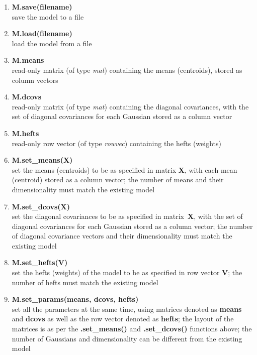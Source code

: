 \begin{enumerate}[{$\bullet$}]
\item
{\bf M.save(filename)}\\
save the model to a file

\item
{\bf M.load(filename)}\\
load the model from a file

\item
{\bf M.means}\\
read-only matrix (of type {\it mat}) containing the means (centroids), stored as column vectors

\item
{\bf M.dcovs}\\
read-only matrix (of type {\it mat}) containing the diagonal covariances, with the set of diagonal covariances for each Gaussian stored as a column vector

\item
{\bf M.hefts}\\
read-only row vector (of type {\it rowvec}) containing the hefts (weights)

\item
{\bf M.set\_means(X)}\\
set the means (centroids) to be as specified in matrix {\bf X}, with each mean (centroid) stored as a column vector;
the number of means and their dimensionality must match the existing model

\item
{\bf M.set\_dcovs(X)}\\
set the diagonal covariances to be as specified in matrix~{\bf X}, with the set of diagonal covariances for each Gaussian stored as a column vector;
the number of diagonal covariance vectors and their dimensionality must match the existing model

\item
{\bf M.set\_hefts(V)}\\
set the hefts (weights) of the model to be as specified in row vector {\bf V};
the number of hefts must match the existing model

\item
{\bf M.set\_params(means, dcovs, hefts)}\\
set all the parameters at the same time, using matrices denoted as {\bf means} and {\bf dcovs} as well as the row vector denoted as {\bf hefts};
the layout of the matrices is as per the {\bf .set\_means()} and {\bf .set\_dcovs()} functions above;
the number of Gaussians and dimensionality can be different from the existing model

\end{enumerate}

